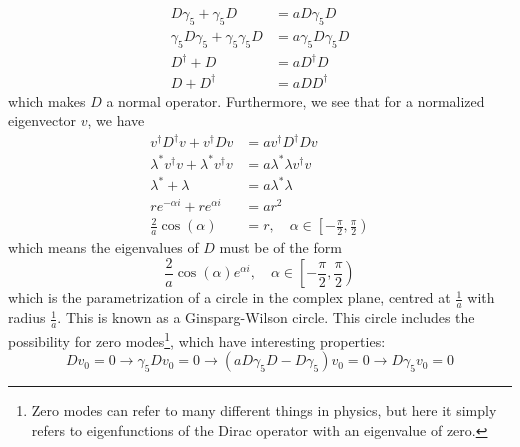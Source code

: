 \documentclass[a4paper,10pt]{article}
\begin{document}
\begin{equation*}
\begin{aligned} 
D \gamma_{5}+\gamma_{5} D&=a D \gamma_{5} D\\
\gamma_5D\gamma_5 + \gamma_5\gamma_5D &= a \gamma_5D\gamma_5D\\D^\dagger +D &= aD^\dagger D\\D +D^\dagger &= aD D^\dagger
\end{aligned}
\end{equation*}
which makes $D$ a normal operator. Furthermore, we see that for a normalized eigenvector $v$, we have
\begin{equation}
\begin{aligned} 
v^\dagger D^\dagger v +v^\dagger Dv &= av^\dagger D^\dagger D v\\\lambda^*v^\dagger v +\lambda^*v^\dagger v &= a \lambda^*\lambda v^\dagger v\\ \lambda^* + \lambda &= a\lambda^*\lambda\\re^{-\alpha i} +re^{\alpha i} &= ar^2\\\frac{2}{a}\cos(\alpha) &= r,\quad\alpha \in \left[-\frac{\pi}{2}, \frac{\pi}{2} \right)
\end{aligned}
\end{equation}
which means the eigenvalues of $D$ must be of the form
\begin{equation}\label{eq:Ginsparg_wilson_circle}
\frac{2}{a}\cos(\alpha)e^{\alpha i},\quad\alpha \in \left[-\frac{\pi}{2}, \frac{\pi}{2} \right)
\end{equation}
which is the parametrization of a circle in the complex plane, centred at $\frac{1}{a}$ with radius $\frac{1}{a}$. This is known as a Ginsparg-Wilson circle. This circle includes the possibility for zero modes\footnote{Zero modes can refer to many different things in physics, but here it simply refers to eigenfunctions of the Dirac operator with an eigenvalue of zero.}, which have interesting properties:
\begin{equation}
Dv_0 = 0 \rightarrow \gamma_5Dv_0 = 0 \rightarrow \left( aD\gamma_5D - D\gamma_5 \right)v_0 = 0 \rightarrow D\gamma_5v_0 = 0
\end{equation}
\end{document}
